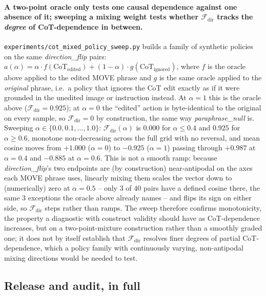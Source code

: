 \paragraph{A two-point oracle only tests one causal dependence against one absence of it; sweeping a mixing weight tests whether $\mathcal{F}_{\text{dir}}$ tracks the \emph{degree} of CoT-dependence in between.} \texttt{experiments/\allowbreak{}cot\_mixed\_policy\_sweep.py} builds a family of synthetic policies on the same \emph{direction\_flip} pairs: $a(\alpha) = \alpha \cdot f(\text{CoT}_{\text{edited}}) + (1-\alpha) \cdot g(\text{CoT}_{\text{ignored}})$, where $f$ is the oracle above applied to the edited MOVE phrase and $g$ is the same oracle applied to the \emph{original} phrase, i.e.\ a policy that ignores the CoT edit exactly as if it were grounded in the unedited image or instruction instead. At $\alpha{=}1$ this is the oracle above ($\mathcal{F}_{\text{dir}}=0.925$); at $\alpha{=}0$ the ``edited'' action is byte-identical to the original on every sample, so $\mathcal{F}_{\text{dir}}=0$ by construction, the same way \emph{paraphrase\_null} is. Sweeping $\alpha \in \{0.0, 0.1, \ldots, 1.0\}$: $\mathcal{F}_{\text{dir}}(\alpha)$ is $0.000$ for $\alpha \leq 0.4$ and $0.925$ for $\alpha \geq 0.6$, monotone non-decreasing across the full grid with no reversal, and mean cosine moves from $+1.000$ ($\alpha{=}0$) to $-0.925$ ($\alpha{=}1$) passing through $+0.987$ at $\alpha{=}0.4$ and $-0.885$ at $\alpha{=}0.6$. This is not a smooth ramp: because \emph{direction\_flip}'s two endpoints are (by construction) near-antipodal on the axes each MOVE phrase uses, linearly mixing them scales the vector down to (numerically) zero at $\alpha{=}0.5$ -- only $3$ of $40$ pairs have a defined cosine there, the same $3$ exceptions the oracle above already names -- and flips its sign on either side, so $\mathcal{F}_{\text{dir}}$ steps rather than ramps. The sweep therefore confirms monotonicity, the property a diagnostic with construct validity should have as CoT-dependence increases, but on a two-point-mixture construction rather than a smoothly graded one; it does not by itself establish that $\mathcal{F}_{\text{dir}}$ resolves finer degrees of partial CoT-dependence, which a policy family with continuously varying, non-antipodal mixing directions would be needed to test.

\subsection{Release and audit, in full}
\label{sec:release}

